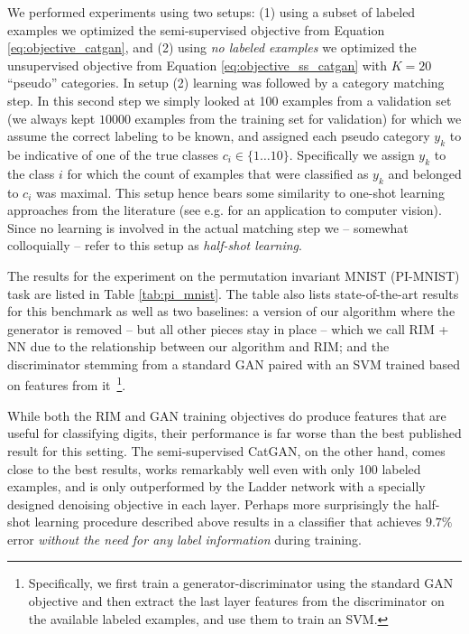 \documentclass{article} \usepackage{iclr2016_conference,times}
\begin{document}
We performed experiments using two setups: (1) using a subset of
labeled examples we optimized the semi-supervised objective from
Equation \eqref{eq:objective_catgan}, and (2) using \emph{no labeled
  examples} we optimized the unsupervised objective from Equation
\eqref{eq:objective_ss_catgan} with $K = 20$ ``pseudo'' categories. In
setup (2) learning was followed by a category matching step. In this
second step we simply looked at 100 examples from a validation set (we
always kept $10000$ examples from the training set for validation) for
which we assume the correct labeling to be known, and assigned each
pseudo category $y_k$ to be indicative of one of the true classes
$c_i \in \lbrace 1 \dots 10 \rbrace$. Specifically we assign $y_k$ to
the class $i$ for which the count of examples that were classified as
$y_k$ and belonged to $c_i$ was maximal. This setup hence bears some
similarity to one-shot learning approaches from the literature (see
e.g. \citet{FeiFeiFergusPeronaPAMI} for an application to computer
vision). Since no learning is involved in the actual matching step we
-- somewhat colloquially -- refer to this setup as \emph{half-shot
  learning}.

The results for the experiment on the permutation invariant MNIST
(PI-MNIST) task are listed in Table \ref{tab:pi_mnist}. The table also
lists state-of-the-art results for this benchmark as well as two
baselines: a version of our algorithm where the generator is removed
-- but all other pieces stay in place -- which we call RIM + NN due to
the relationship between our algorithm and RIM; and the discriminator
stemming from a standard GAN paired with an SVM trained based on
features from it~\footnote{Specifically, we first train a
  generator-discriminator using the standard GAN objective and then
  extract the last layer features from the discriminator on the
  available labeled examples, and use them to train an SVM.}.

While both the RIM and GAN training objectives do produce features
that are useful for classifying digits, their performance is far worse
than the best published result for this setting. The semi-supervised
CatGAN, on the other hand, comes close to the best results, works
remarkably well even with only 100 labeled examples, and is only
outperformed by the Ladder network with a specially designed denoising
objective in each layer.
Perhaps more surprisingly the half-shot learning procedure
described above results in a classifier that achieves $9.7 \%$
error \emph{without the need for any label information} during training. 
\end{document}
